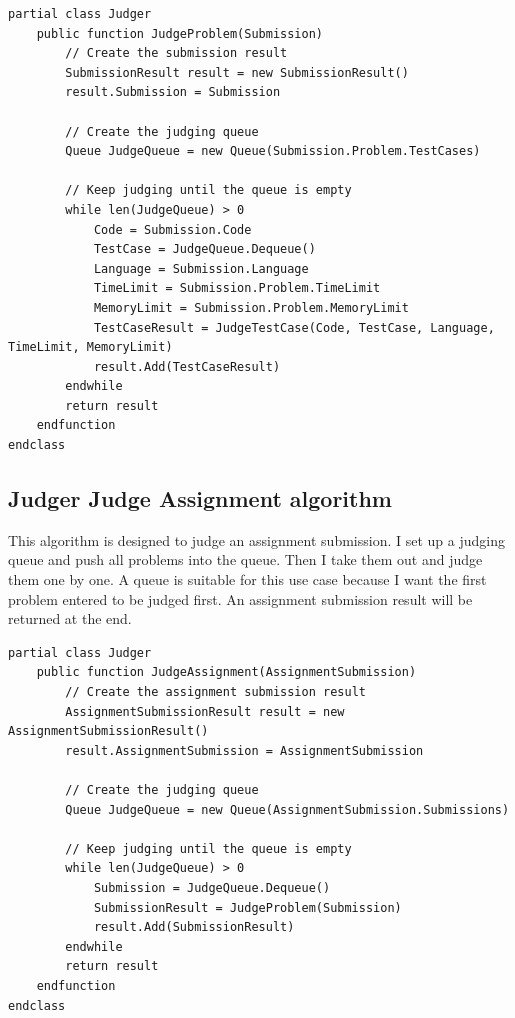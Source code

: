\documentclass[a4paper]{report}
\begin{document}
\begin{verbatim}
partial class Judger
    public function JudgeProblem(Submission)
        // Create the submission result
        SubmissionResult result = new SubmissionResult()
        result.Submission = Submission

        // Create the judging queue
        Queue JudgeQueue = new Queue(Submission.Problem.TestCases)

        // Keep judging until the queue is empty
        while len(JudgeQueue) > 0
            Code = Submission.Code
            TestCase = JudgeQueue.Dequeue()
            Language = Submission.Language
            TimeLimit = Submission.Problem.TimeLimit
            MemoryLimit = Submission.Problem.MemoryLimit
            TestCaseResult = JudgeTestCase(Code, TestCase, Language, TimeLimit, MemoryLimit)
            result.Add(TestCaseResult)
        endwhile
        return result
    endfunction
endclass
\end{verbatim}

\subsection{Judger Judge Assignment algorithm}

This algorithm is designed to judge an assignment submission. I set up a judging queue and push all problems into the queue. Then I take them out and judge them one by one. A queue is suitable for this use case because I want the first problem entered to be judged first. An assignment submission result will be returned at the end.

\begin{verbatim}
partial class Judger
    public function JudgeAssignment(AssignmentSubmission)
        // Create the assignment submission result
        AssignmentSubmissionResult result = new AssignmentSubmissionResult()
        result.AssignmentSubmission = AssignmentSubmission

        // Create the judging queue
        Queue JudgeQueue = new Queue(AssignmentSubmission.Submissions)

        // Keep judging until the queue is empty
        while len(JudgeQueue) > 0
            Submission = JudgeQueue.Dequeue()
            SubmissionResult = JudgeProblem(Submission)
            result.Add(SubmissionResult)
        endwhile
        return result
    endfunction
endclass
\end{verbatim}
\end{document}
